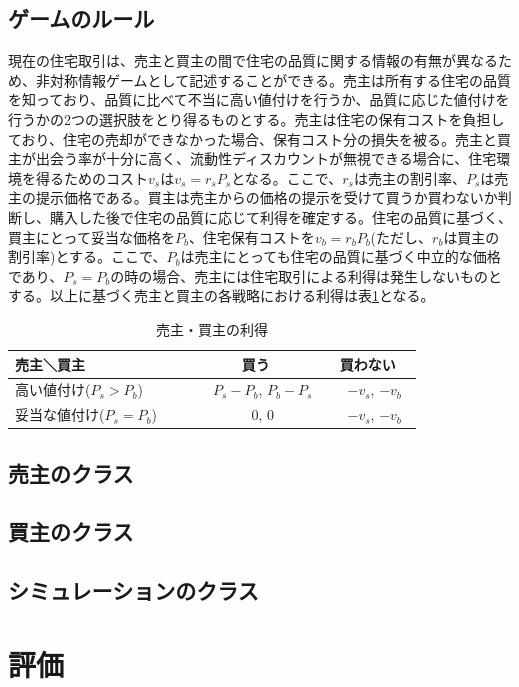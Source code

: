 \documentclass[a4paper,fontsize=11pt,report,notitlepage,line_length=38zw,number_of_lines=40,dvipdfmx]{jlreq}
\begin{document}
\section{ゲームのルール}
現在の住宅取引は、売主と買主の間で住宅の品質に関する情報の有無が異なるため、非対称情報ゲームとして記述することができる。売主は所有する住宅の品質を知っており、品質に比べて不当に高い値付けを行うか、品質に応じた値付けを行うかの2つの選択肢をとり得るものとする。売主は住宅の保有コストを負担しており、住宅の売却ができなかった場合、保有コスト分の損失を被る。売主と買主が出会う率が十分に高く、流動性ディスカウントが無視できる場合に、住宅環境を得るためのコスト$v_s$は$v_s=r_sP_s$となる。ここで、$r_s$は売主の割引率、$P_s$は売主の提示価格である。買主は売主からの価格の提示を受けて買うか買わないか判断し、購入した後で住宅の品質に応じて利得を確定する。住宅の品質に基づく、買主にとって妥当な価格を$P_b$、住宅保有コストを$v_b=r_bP_b$(ただし、$r_b$は買主の割引率)とする。ここで、$P_b$は売主にとっても住宅の品質に基づく中立的な価格であり、$P_s=P_b$の時の場合、売主には住宅取引による利得は発生しないものとする。以上に基づく売主と買主の各戦略における利得は表\ref{ritoku}となる。

\begin{table}
\begin{center}
\caption{売主・買主の利得}
\label{ritoku}
\begin{tabular}{l|cc}
売主＼買主 & 買う & 買わない \\ \hline
高い値付け($P_s>P_b$)　　 & 　$P_s-P_b$,  $P_b-P_s$ & 　$-v_s$,  $-v_b$　 \\
妥当な値付け($P_s=P_b$)　　 & 　0, 0 & 　$-v_s$,  $-v_b$　
\end{tabular}
\end{center}
\end{table}%

\section{売主のクラス}
\section{買主のクラス}
\section{シミュレーションのクラス}

\chapter{評価}
\end{document}
